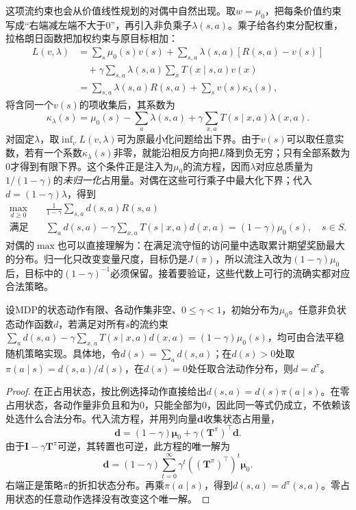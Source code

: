 这项流约束也会从价值线性规划的对偶中自然出现。取$w=\mu_0$，把每条价值约束写成“右端减左端不大于0”，再引入非负乘子$\lambda(s,a)$。乘子给各约束分配权重，拉格朗日函数把加权约束与原目标相加：
\[
 \begin{aligned}
 L(v,\lambda)
 &=\sum_s\mu_0(s)v(s)
 +\sum_{s,a}\lambda(s,a)[R(s,a)-v(s)]\\
 &\quad+\gamma\sum_{s,a}\lambda(s,a)\sum_xT(x\mid s,a)v(x)\\
 &=\sum_{s,a}\lambda(s,a)R(s,a)+\sum_s v(s)\kappa_\lambda(s),
 \end{aligned}
 \]
将含同一个$v(s)$的项收集后，其系数为
\[
 \kappa_\lambda(s)=\mu_0(s)-\sum_a\lambda(s,a)
       +\gamma\sum_{x,a}T(s\mid x,a)\lambda(x,a).
\]
对固定$\lambda$，取$\inf_v L(v,\lambda)$可为原最小化问题给出下界。由于$v(s)$可以取任意实数，若有一个系数$\kappa_\lambda(s)$非零，就能沿相反方向把$L$降到负无穷；只有全部系数为0才得到有限下界。这个条件正是注入为$\mu_0$的流方程，因而$\lambda$对应总质量为$1/(1-\gamma)$的\emph{未归一化}占用量。对偶在这些可行乘子中最大化下界；代入$d=(1-\gamma)\lambda$，得到
\begin{equation}
 \begin{aligned}
 \max_{d\geq0}\quad&
 \frac{1}{1-\gamma}\sum_{s,a}d(s,a)R(s,a)\\
 \text{满足}\quad&
 \sum_a d(s,a)-\gamma\sum_{x,a}T(s\mid x,a)d(x,a)
   =(1-\gamma)\mu_0(s),\quad s\in S.
 \end{aligned}
 \label{eq:rl-planning-occupancy-lp}
\end{equation}
对偶的$\max$也可以直接理解为：在满足流守恒的访问量中选取累计期望奖励最大的分布。归一化只改变变量尺度，目标仍是$J(\pi)$，所以流注入改为$(1-\gamma)\mu_0$后，目标中的$(1-\gamma)^{-1}$必须保留。接着要验证，这些代数上可行的流确实都对应合法策略。

\begin{theorem}[可行占用量的策略实现]
 \label{thm:rl-planning-occupancy-realization}
 设MDP的状态动作有限、各动作集非空、$0\leq\gamma<1$，初始分布为$\mu_0$。任意非负状态动作函数$d$，若满足对所有$s$的流约束$\sum_a d(s,a)-\gamma\sum_{x,a}T(s\mid x,a)d(x,a)=(1-\gamma)\mu_0(s)$，均可由合法平稳随机策略实现。具体地，令$d(s)=\sum_a d(s,a)$；在$d(s)>0$处取$\pi(a\mid s)=d(s,a)/d(s)$，在$d(s)=0$处任取合法动作分布，则$d=d^\pi$。
\end{theorem}
\begin{proof}
 在正占用状态，按比例选择动作直接给出$d(s,a)=d(s)\pi(a\mid s)$。在零占用状态，各动作量非负且和为0，只能全部为0，因此同一等式仍成立，不依赖该处选什么合法分布。代入流方程，并用列向量$\bm d$收集状态占用量，
 \[
 \bm d=(1-\gamma)\bm\mu_0+\gamma(\bm T^\pi)^\top\bm d.
 \]
 由于$\bm I-\gamma\bm T^\pi$可逆，其转置也可逆，此方程的唯一解为
 \[
 \bm d=(1-\gamma)\sum_{t=0}^{\infty}
 \gamma^t((\bm T^\pi)^\top)^t\bm\mu_0.
 \]
 右端正是策略$\pi$的折扣状态分布。再乘$\pi(a\mid s)$，得到$d(s,a)=d^\pi(s,a)$。零占用状态的任意动作选择没有改变这个唯一解。
\end{proof}

